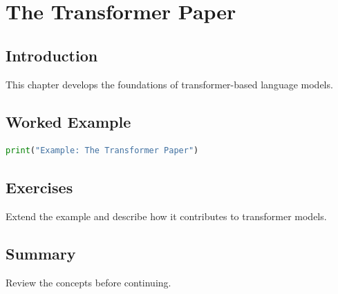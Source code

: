 \chapter{The Transformer Paper}
\label{chap:vol8-11}
\section{Introduction}
This chapter develops the foundations of transformer-based language models.

\section{Worked Example}
\begin{lstlisting}[language=Python]
print("Example: The Transformer Paper")
\end{lstlisting}

\section{Exercises}
\begin{exercise}
Extend the example and describe how it contributes to transformer models.
\end{exercise}

\section{Summary}
Review the concepts before continuing.
